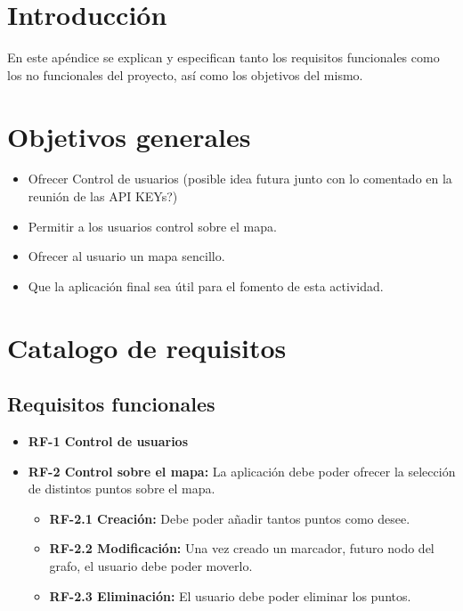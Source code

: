 
\section{Introducción}
En este apéndice se explican y especifican tanto los requisitos funcionales como los no funcionales del proyecto, así como los objetivos del mismo.

\section{Objetivos generales}

\begin{itemize}
    \item Ofrecer Control de usuarios (posible idea futura junto con lo comentado en la reunión de las API KEYs?)
    \item Permitir a los usuarios control sobre el mapa.
    \item Ofrecer al usuario un mapa sencillo.
    \item Que la aplicación final sea útil para el fomento de esta actividad.
\end{itemize}

\section{Catalogo de requisitos}

\subsection{Requisitos funcionales}
\begin{itemize}
	\item \textbf{RF-1 Control de usuarios}
	\item \textbf{RF-2 Control sobre el mapa:} La aplicación debe poder ofrecer la selección de distintos puntos sobre el mapa.
	\begin{itemize}
		\item \textbf{RF-2.1 Creación:} Debe poder añadir tantos puntos como desee.
		\item \textbf{RF-2.2 Modificación:} Una vez creado un marcador, futuro nodo del grafo, el usuario debe poder moverlo.
		\item \textbf{RF-2.3 Eliminación:} El usuario debe poder eliminar los puntos.
	\end{itemize}
\end{itemize}


